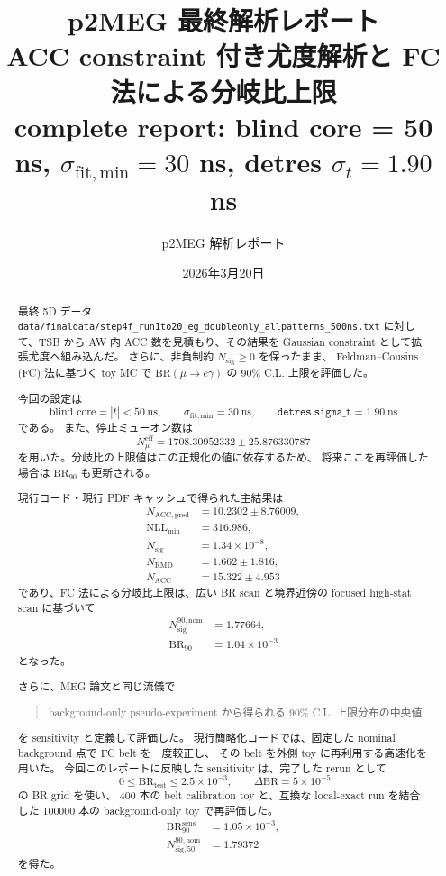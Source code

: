 \documentclass[a4paper,11pt]{jsarticle}
\title{p2MEG 最終解析レポート\\
ACC constraint 付き尤度解析と FC 法による分岐比上限\\
complete report: blind core = 50 ns, \(\sigma_{\mathrm{fit,min}}=30\) ns, detres \(\sigma_t=1.90\) ns}
\author{p2MEG 解析レポート}
\date{2026年3月20日}
\begin{document}
\maketitle

\begin{abstract}
最終 5D データ
\texttt{data/finaldata/step4f\_run1to20\_eg\_doubleonly\_allpatterns\_500ns.txt}
に対して、TSB から AW 内 ACC 数を見積もり、その結果を Gaussian constraint として拡張尤度へ組み込んだ。
さらに、非負制約 \(N_{\mathrm{sig}}\ge 0\) を保ったまま、
Feldman--Cousins (FC) 法に基づく toy MC で
\(\mathrm{BR}(\mu\to e\gamma)\) の 90\% C.L. 上限を評価した。

今回の設定は
\[
\text{blind core}=|t|<50\ \mathrm{ns},\qquad
\sigma_{\mathrm{fit,min}}=30\ \mathrm{ns},\qquad
\texttt{detres.sigma\_t}=1.90\ \mathrm{ns}
\]
である。
また、停止ミューオン数は
\[
N_{\mu}^{\mathrm{eff}} = 1708.30952332 \pm 25.876330787
\]
を用いた。分岐比の上限値はこの正規化の値に依存するため、
将来ここを再評価した場合は \(\mathrm{BR}_{90}\) も更新される。

現行コード・現行 PDF キャッシュで得られた主結果は
\begin{align}
N_{\mathrm{ACC,pred}} &= 10.2302 \pm 8.76009,\\
\mathrm{NLL}_{\min} &= 316.986,\\
N_{\mathrm{sig}} &= 1.34\times 10^{-8},\\
N_{\mathrm{RMD}} &= 1.662 \pm 1.816,\\
N_{\mathrm{ACC}} &= 15.322 \pm 4.953
\end{align}
であり、FC 法による分岐比上限は、広い BR scan と境界近傍の focused high-stat scan に基づいて
\begin{align}
N_{\mathrm{sig}}^{90,\mathrm{nom}} &= 1.77664,\\
\mathrm{BR}_{90} &= 1.04\times 10^{-3}
\end{align}
となった。

さらに、MEG 論文と同じ流儀で
\begin{quote}
background-only pseudo-experiment から得られる 90\% C.L. 上限分布の中央値
\end{quote}
を sensitivity と定義して評価した。
現行簡略化コードでは、固定した nominal background 点で FC belt を一度較正し、
その belt を外側 toy に再利用する高速化を用いた。
今回このレポートに反映した sensitivity は、完了した rerun として
\[
\;0 \le \mathrm{BR}_{\mathrm{test}} \le 2.5\times10^{-3},
\qquad
\Delta\mathrm{BR}=5\times10^{-5}
\]
の BR grid を使い、
400 本の belt calibration toy と、互換な local-exact run を結合した
100000 本の background-only toy で再評価した。
\begin{align}
\mathrm{BR}_{90}^{\mathrm{sens}} &= 1.05\times 10^{-3},\\
N_{\mathrm{sig},50}^{90,\mathrm{nom}} &= 1.79372
\end{align}
を得た。
\end{abstract}
\end{document}
